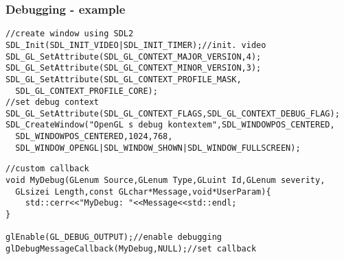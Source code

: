 \begin{frame}[fragile]
\frametitle{Debugging - example}
	{\scriptsize
	\begin{verbatim}
//create window using SDL2
SDL_Init(SDL_INIT_VIDEO|SDL_INIT_TIMER);//init. video
SDL_GL_SetAttribute(SDL_GL_CONTEXT_MAJOR_VERSION,4);
SDL_GL_SetAttribute(SDL_GL_CONTEXT_MINOR_VERSION,3);
SDL_GL_SetAttribute(SDL_GL_CONTEXT_PROFILE_MASK,
  SDL_GL_CONTEXT_PROFILE_CORE);
//set debug context
SDL_GL_SetAttribute(SDL_GL_CONTEXT_FLAGS,SDL_GL_CONTEXT_DEBUG_FLAG);
SDL_CreateWindow("OpenGL s debug kontextem",SDL_WINDOWPOS_CENTERED,
  SDL_WINDOWPOS_CENTERED,1024,768,
  SDL_WINDOW_OPENGL|SDL_WINDOW_SHOWN|SDL_WINDOW_FULLSCREEN);
\end{verbatim}
}
{\scriptsize
\begin{verbatim}
//custom callback
void MyDebug(GLenum Source,GLenum Type,GLuint Id,GLenum severity,
  GLsizei Length,const GLchar*Message,void*UserParam){
    std::cerr<<"MyDebug: "<<Message<<std::endl;
}

glEnable(GL_DEBUG_OUTPUT);//enable debugging
glDebugMessageCallback(MyDebug,NULL);//set callback
	\end{verbatim}
	}
\end{frame}

